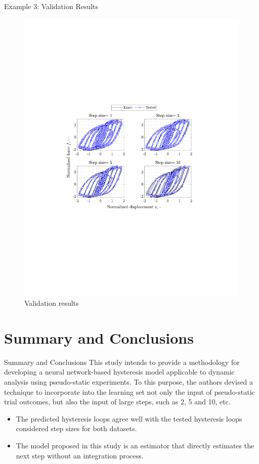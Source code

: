 \documentclass[9pt]{beamer}
\newcounter{frame}[frame]
\begin{document}
\begin{frame}{Example 3: Validation Results}
\begin{figure}
	\includegraphics[height=.8\textheight]{neuralNetHysteresis03Test}
	\caption{Validation results}
\end{figure}
\end{frame}

\section{Summary and Conclusions}
\begin{frame}{Summary and Conclusions}
This study intends to provide a methodology for developing a neural network-based hysteresis model applicable to dynamic analysis using pseudo-static experiments. To this purpose, the authors devised a technique to incorporate into the learning set not only the input of pseudo-static trial outcomes, but also the input of large steps, such as 2, 5 and 10, etc. 

\begin{itemize}
	\item The predicted hysteresis loops agree well with the tested hysteresis loops considered step sizes for both datasets.
	\item  The model proposed in this study is an estimator that directly estimates the next step without an integration process.
\end{itemize}
\end{frame}
\end{document}
